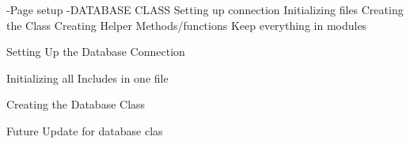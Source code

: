 -Page setup
-DATABASE CLASS
     Setting up connection
     Initializing files
     Creating the Class
     Creating Helper Methods/functions
     Keep everything in modules

Setting Up the Database Connection

Initializing all Includes in one file

Creating the Database Class

Future Update for database clas